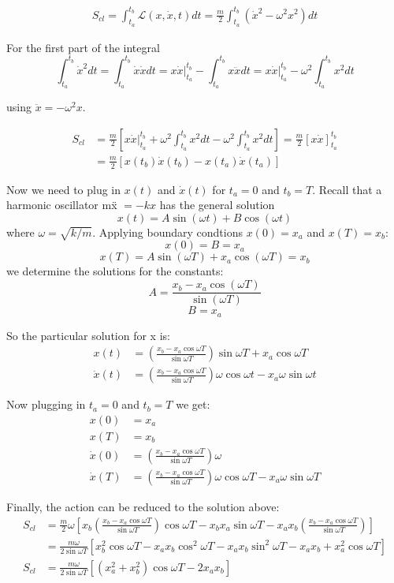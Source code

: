 \documentclass{article}
\begin{document}
\begin{align*}
S_{cl} = \int^{t_b}_{t_a} \mathcal{L}(x, \dot{x}, t) dt = \frac{m}{2} \int^{t_b}_{t_a} (\dot{x}^2 - \omega^2 x^2) dt
\end{align*}

For the first part of the integral
\[\int^{t_b}_{t_a} \dot{x}^2 dt = \int^{t_b}_{t_a} \dot{x}\dot{x} dt = x\dot{x} \big\rvert^{t_b}_{t_a} - \int^{t_b}_{t_a} x\ddot{x} dt = x\dot{x} \big\rvert^{t_b}_{t_a} - \omega^2 \int^{t_b}_{t_a} x^2 dt \]

using $\ddot{x} = -\omega^2 x$.

\begin{align*}
	S_{cl} 
	&= \frac{m}{2} \left[x\dot{x} \big\rvert^{t_b}_{t_a} +  \omega^2 \int^{t_b}_{t_a} x^2 dt -  \omega^2 \int^{t_b}_{t_a} x^2 dt \right] = \frac{m}{2} \left[x\dot{x} \right]^{t_b}_{t_a} \\
	&= \frac{m}{2} \left[x(t_b)\dot{x}(t_b) - x(t_a)\dot{x}(t_a) \right]
\end{align*}

Now we need to plug in $x(t)$ and $\dot{x}(t)$ for $t_a = 0$ and $t_b = T$. Recall that a harmonic oscillator m\"x $= -kx$ has the general solution 
	\[x(t) = A\sin(\omega t) + B\cos(\omega t)\]
where $\omega = \sqrt{k/m}$. Applying boundary condtions $x(0) = x_a$ and $x(T) = x_b$:
	\[x(0) = B = x_a \]
	\[x(T) = A \sin(\omega T) + x_a \cos(\omega T) = x_b \]
we determine the solutions for the constants:
	\[A = \frac{x_b - x_a \cos(\omega T)}{\sin(\omega T)} \]
	\[B = x_a \]

So the particular solution for x is:
\begin{align*}
	x(t) &= \left(\frac{x_b - x_a\cos\omega T}{\sin\omega T} \right) \sin\omega T + x_a \cos\omega T \\
	\dot{x}(t) &= \left(\frac{x_b - x_a\cos\omega T}{\sin\omega T} \right) \omega \cos\omega t - x_a \omega \sin\omega t
\end{align*}

Now plugging in $t_a = 0$ and $t_b = T$ we get:
\begin{align*}
	x(0) &= x_a \\
	x(T) &= x_b \\
	\dot{x}(0) &= \left(\frac{x_b - x_a\cos\omega T}{\sin\omega T} \right) \omega \\
	\dot{x}(T) &= \left(\frac{x_b - x_a\cos\omega T}{\sin\omega T} \right) \omega \cos\omega T - x_a \omega \sin\omega T
\end{align*}

Finally, the action can be reduced to the solution above:
\begin{align*}
	S_{cl} &= \frac{m}{2} \omega \left[x_b \left(\frac{x_b - x_a\cos\omega T}{\sin\omega T} \right) \cos\omega T  -x_b x_a \sin\omega T - x_a x_b \left(\frac{x_b - x_a\cos\omega T}{\sin\omega T} \right)  \right] \\
	&= \frac{m\omega}{2\sin\omega T} \left[x_b^2 \cos\omega T - x_a x_b \cos^2\omega T - x_a x_b \sin^2\omega T - x_a x_b + x_a^2\cos\omega T \right] \\
	S_{cl} &= \frac{m\omega}{2 \sin\omega T} \left[(x_a^2 + x_b^2) \cos \omega T - 2x_a x_b \right]
\end{align*}
\end{document}
